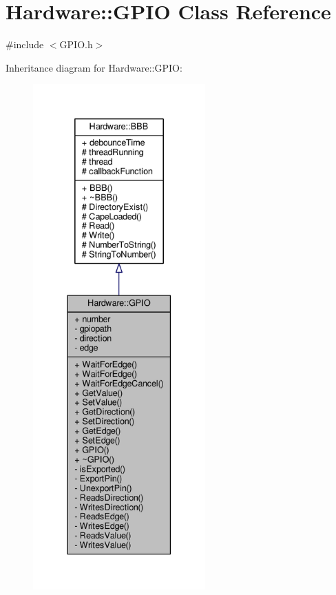 \hypertarget{class_hardware_1_1_g_p_i_o}{}\section{Hardware\+:\+:G\+P\+I\+O Class Reference}
\label{class_hardware_1_1_g_p_i_o}


{\ttfamily \#include $<$G\+P\+I\+O.\+h$>$}



Inheritance diagram for Hardware\+:\+:G\+P\+I\+O\+:\nopagebreak
\begin{figure}[H]
\begin{center}
\leavevmode
\includegraphics[height=550pt]{class_hardware_1_1_g_p_i_o__inherit__graph}
\end{center}
\end{figure}


